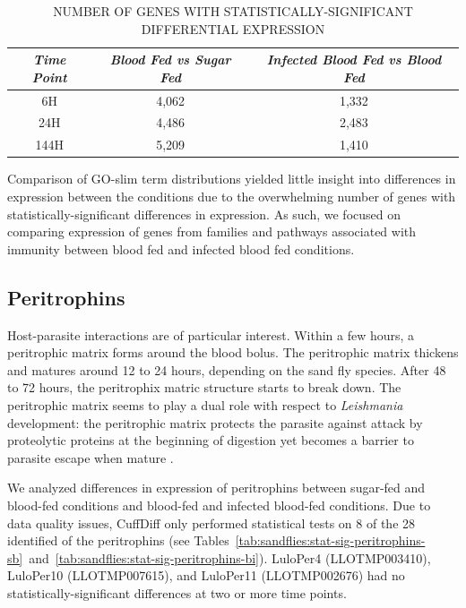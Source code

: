 \begin{table}[H]
  \centering
  \caption{\uppercase{Number of Genes with Statistically-Significant Differential Expression}}
  \begin{tabular}{c c c} \hline
  \emph{Time Point} & \emph{Blood Fed vs Sugar Fed} & \emph{Infected Blood Fed vs Blood Fed} \\ \hline
  6H & 4,062 & 1,332 \\
  24H & 4,486 & 2,483 \\
  144H & 5,209 & 1,410 \\
  \end{tabular}
  \label{tab:stat-sig-genes}
\end{table}

Comparison of GO-slim term distributions yielded little insight into differences in expression between the conditions due to the overwhelming number of genes with statistically-significant differences in expression.  As such, we focused on comparing expression of genes from families and pathways associated with immunity between blood fed and infected blood fed conditions.

\subsection{Peritrophins}
Host-parasite interactions are of particular interest.  Within a few hours, a peritrophic matrix forms around the blood bolus.  The peritrophic matrix thickens and matures around 12 to 24 hours, depending on the sand fly species.  After 48 to 72 hours, the peritrophix matric structure starts to break down.  The peritrophic matrix seems to play a dual role with respect to \emph{Leishmania} development: the peritrophic matrix protects the parasite against attack by proteolytic proteins at the beginning of digestion yet becomes a barrier to parasite escape when mature \cite{Pimenta1997,Dostalova2012}.

We analyzed differences in expression of peritrophins between sugar-fed and blood-fed conditions and blood-fed and infected blood-fed conditions.  Due to data quality issues, CuffDiff only performed statistical tests on 8 of the 28 identified of the peritrophins (see Tables~\ref{tab:sandflies:stat-sig-peritrophins-sb}~and~\ref{tab:sandflies:stat-sig-peritrophins-bi}).  LuloPer4 (LLOTMP003410), LuloPer10 (LLOTMP007615), and LuloPer11 (LLOTMP002676) had no statistically-significant differences at two or more time points.

